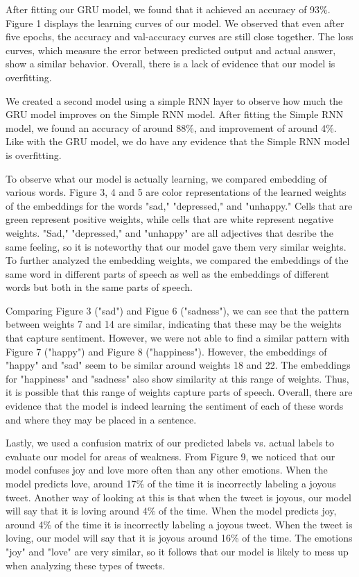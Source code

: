 \documentclass[11pt]{article}
\begin{document}
After fitting our GRU model, we found that it achieved an accuracy of 93\%. Figure 1 displays the learning curves of our model. We observed that even after five epochs, the accuracy and val-accuracy curves are still close together. The loss curves, which measure the error between predicted output and actual answer, show a similar behavior. Overall, there is a lack of evidence that our model is overfitting.

We created a second model using a simple RNN layer to observe how much the GRU model improves on the Simple RNN model. After fitting the Simple RNN model, we found an accuracy of around 88\%, and improvement of around 4\%. Like with the GRU model, we do have any evidence that the Simple RNN model is overfitting.

To observe what our model is actually learning, we compared embedding of various words. Figure 3, 4 and 5 are color representations of the learned weights of the embeddings for the words "sad," "depressed," and "unhappy." Cells that are green represent positive weights, while cells that are white represent negative weights. "Sad," "depressed," and "unhappy" are all adjectives that desribe the same feeling, so it is noteworthy that our model gave them very similar weights. To further analyzed the embedding weights, we compared the embeddings of the same word in different parts of speech as well as the embeddings of different words but both in the same parts of speech.

Comparing Figure 3 ("sad") and Figue 6 ("sadness"), we can see that the pattern between weights 7 and 14 are similar, indicating that these may be the weights that capture sentiment. However, we were not able to find a similar pattern with Figure 7 ("happy") and Figure 8 ("happiness"). However, the embeddings of "happy" and "sad" seem to be similar around weights 18 and 22. The embeddings for "happiness" and "sadness" also show similarity at this range of weights. Thus, it is possible that this range of weights capture parts of speech. Overall, there are evidence that the model is indeed learning the sentiment of each of these words and where they may be placed in a sentence. 

Lastly, we used a confusion matrix of our predicted labels vs. actual labels to evaluate our model for areas of weakness. From Figure 9, we noticed that our model confuses joy and love more often than any other emotions. When the model predicts love, around 17\% of the time it is incorrectly labeling a joyous tweet. Another way of looking at this is that when the tweet is joyous, our model will say that it is loving around 4\% of the time. When the model predicts joy, around 4\% of the time it is incorrectly labeling a joyous tweet. When the tweet is loving, our model will say that it is joyous around 16\% of the time. The emotions "joy" and "love" are very similar, so it follows that our model is likely to mess up when analyzing these types of tweets.
\end{document}
